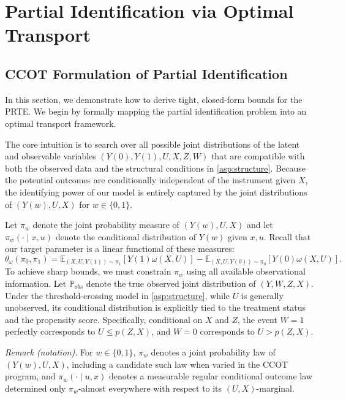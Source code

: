 \section{Partial Identification via Optimal Transport}  \label{sec:pid}


\subsection{CCOT Formulation of Partial Identification}\label{subsec:ot_formulation}
In this section, we demonstrate how to derive tight, closed-form bounds for the PRTE. We begin by formally mapping the partial identification problem into an optimal transport framework.

The core intuition is to search over all possible joint distributions of the latent and observable variables $(Y(0), Y(1), U, X, Z, W)$ that are compatible with both the observed data and the structural conditions in \cref{asp:structure}. Because the potential outcomes are conditionally independent of the instrument given $X$, the identifying power of our model is entirely captured by the joint distributions of $(Y(w), U, X)$ for $w \in \{0, 1\}$.

Let $\pi_w$ denote the joint probability measure of $(Y(w), U, X)$ and let $\pi_w(\cdot\mid x,u)$ denote the conditional distribution of $Y(w)$ given $x,u$. Recall that our target parameter is a linear functional of these measures:
\[\theta_\omega(\pi_0, \pi_1) = \mathbb{E}_{(X,U,Y(1))\sim\pi_1} [Y(1) \omega(X,U)] - \mathbb{E}_{(X,U,Y(0))\sim\pi_0} [Y(0) \omega(X,U)]. \]
To achieve sharp bounds, we must constrain $\pi_w$ using all available observational information. Let $\mathbb{P}_{obs}$ denote the true observed joint distribution of $(Y, W, Z, X)$. Under the threshold-crossing model in \cref{asp:structure}, while $U$ is generally unobserved, its conditional distribution is explicitly tied to the treatment status and the propensity score. Specifically, conditional on $X$ and $Z$, the event $W=1$ perfectly corresponds to $U \leqslant p(Z,X)$, and $W=0$ corresponds to $U > p(Z,X)$.

\noindent\textit{Remark (notation).} For $w\in\{0,1\}$, $\pi_w$ denotes a joint probability law of $(Y(w),U,X)$, including a candidate such law when varied in the CCOT program, and $\pi_w(\cdot\mid u,x)$ denotes a measurable regular conditional outcome law determined only $\pi_w$-almost everywhere with respect to its $(U,X)$-marginal.



